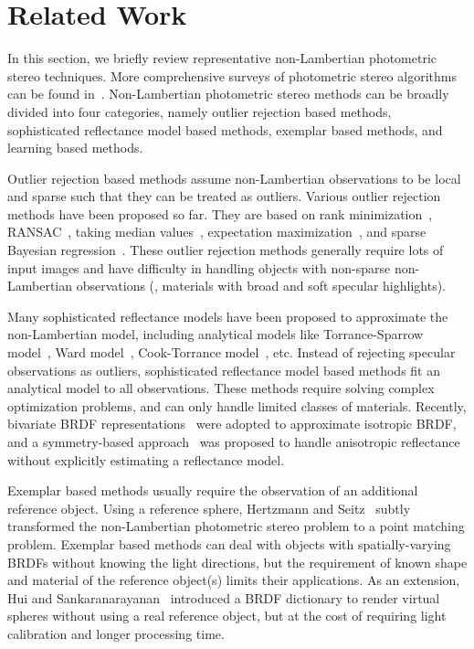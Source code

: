 \section{Related Work}
\label{sec:psfcn_related_work}
In this section, we briefly review representative non-Lambertian photometric stereo techniques. More comprehensive surveys of photometric stereo algorithms can be found in~\cite{herbort2011introduction,shi2019benchmark}. Non-Lambertian photometric stereo methods can be broadly divided into four categories, namely outlier rejection based methods, sophisticated reflectance model based methods, exemplar based methods, and learning based methods.

Outlier rejection based methods assume non-Lambertian observations to be local and sparse such that they can be treated as outliers. Various outlier rejection methods have been proposed so far. They are based on rank minimization~\cite{wu2010robust}, RANSAC~\cite{mukaigawa2007analysis}, taking median values~\cite{miyazaki2010median}, expectation maximization~\cite{wu2010photometric}, and sparse Bayesian regression~\cite{ikehata2012robust}. These outlier rejection methods generally require lots of input images and have difficulty in handling objects with non-sparse non-Lambertian observations (\eg, materials with broad and soft specular highlights).

Many sophisticated reflectance models have been proposed to approximate the non-Lambertian model, including analytical models like Torrance-Sparrow model~\cite{georghiades2003incorporating}, Ward model~\cite{chung2008efficient}, Cook-Torrance model~\cite{ruiters2009heightfield}, etc.
Instead of rejecting specular observations as outliers, sophisticated reflectance model based methods fit an analytical model to all observations.  These methods require solving complex optimization problems, and can only handle limited classes of materials. Recently, bivariate BRDF representations~\cite{shi2014bi,ikehata2014p} were adopted to approximate isotropic BRDF, and a symmetry-based approach~\cite{holroyd2008photometric} was proposed to handle anisotropic reflectance without explicitly estimating a reflectance model. 

Exemplar based methods usually require the observation of an additional reference object. Using a reference sphere, Hertzmann and Seitz~\cite{hertzmann2005example} subtly transformed the non-Lambertian photometric stereo problem to a point matching problem. Exemplar based methods can deal with objects with spatially-varying BRDFs without knowing the light directions, but the requirement of known shape and material of the reference object(s) limits their applications. As an extension, Hui and Sankaranarayanan~\cite{zhui2015ps} introduced a BRDF dictionary to render virtual spheres without using a real reference object, but at the cost of requiring light calibration and longer processing time.

